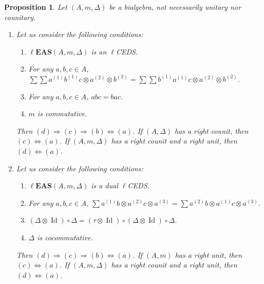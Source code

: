 \documentclass[10pt,a4paper]{amsart}
\numberwithin{equation}{section}
\newtheorem{Proposition}[Theorem]{Proposition}
 { \theoremstyle{definition}
\newtheorem{Definition}[Theorem]{Definition}
\newtheorem{Note}[Theorem]{Note}
\newtheorem{Example}[Theorem]{Example}
\newtheorem{Remark}[Theorem]{Remark}
\newtheorem{Notation}[Theorem]{Notation}}
\newcommand{\leas}{\ell\mathbf{EAS}}
\begin{document}
\begin{Proposition}\label{prop5.2}
Let $(A,m,\Delta)$ be a bialgebra, not necessarily unitary nor counitary.
\begin{enumerate}\itemsep=0pt
\item[$(1)$] Let us consider the following conditions:
\begin{enumerate}\itemsep=0pt
\item[$(a)$] $\leas(A,m,\Delta)$ is an $\ell$CEDS.
\item[$(b)$] For any $a,b,c\in A$, $\sum \sum a^{(1)}b^{(1)}c\otimes a^{(2)}\otimes b^{(2)}=\sum \sum b^{(1)}a^{(1)}c\otimes a^{(2)}\otimes b^{(2)}$.
\item[$(c)$] For any $a,b,c\in A$, $abc=bac$.
\item[$(d)$] $m$ is commutative.
\end{enumerate}
Then $(d)\Longrightarrow (c)\Longrightarrow (b)\Longleftrightarrow (a)$. If $(A,\Delta)$ has a right counit, then $(c)\Longleftrightarrow (a)$. If $(A,m,\Delta)$ has a right counit and a right unit, then $(d)\Longleftrightarrow (a)$.
\item[$(2)$] Let us consider the following conditions:
\begin{enumerate}\itemsep=0pt
\item[$(a)$] $\leas(A,m,\Delta)$ is a dual $\ell$CEDS.
\item[$(b)$] For any $a,b,c\in A$,
$\sum a^{(1)}b\otimes a^{(2)}c\otimes a^{(3)}=\sum a^{(2)}b\otimes a^{(1)}c \otimes a^{(3)}$.
\item[$(c)$] $(\Delta \otimes \operatorname{Id})\circ \Delta=(\tau \otimes \operatorname{Id})\circ (\Delta \otimes \operatorname{Id})\circ \Delta$.
\item[$(d)$] $\Delta$ is cocommutative.
\end{enumerate}
Then $(d)\Longrightarrow (c)\Longrightarrow (b)\Longleftrightarrow (a)$. If $(A,m)$ has a right unit, then $(c)\Longleftrightarrow (a)$. If $(A,m,\Delta)$ has a right counit and a right unit, then $(d)\Longleftrightarrow (a)$.
\end{enumerate}
\end{Proposition}
\end{document}
